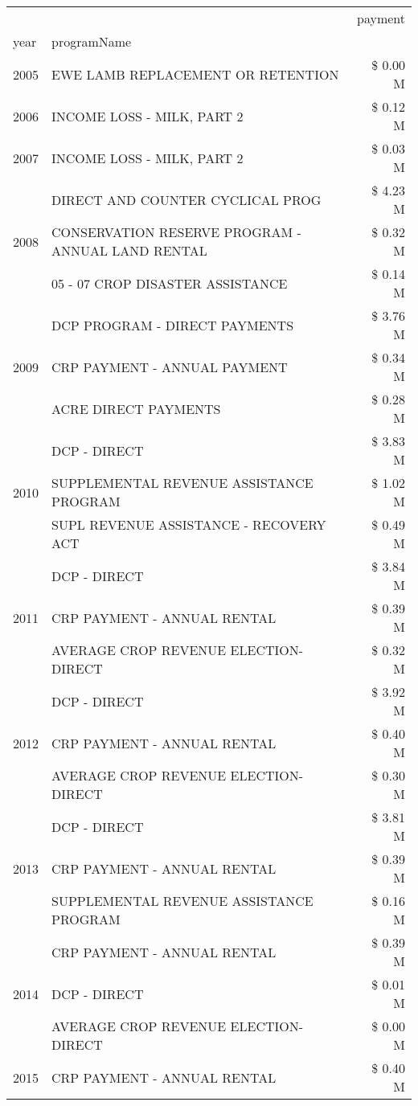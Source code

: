 \begin{tabular}{llr}
\toprule
 &  & payment \\
year & programName &  \\
\midrule
2005 & EWE LAMB REPLACEMENT OR RETENTION & \$ 0.00 M \\
\cline{1-3}
2006 & INCOME LOSS - MILK, PART 2 & \$ 0.12 M \\
\cline{1-3}
2007 & INCOME LOSS - MILK, PART 2 & \$ 0.03 M \\
\cline{1-3}
\multirow[t]{3}{*}{2008} & DIRECT AND COUNTER CYCLICAL PROG & \$ 4.23 M \\
 & CONSERVATION RESERVE PROGRAM - ANNUAL LAND RENTAL & \$ 0.32 M \\
 & 05 - 07 CROP DISASTER ASSISTANCE & \$ 0.14 M \\
\cline{1-3}
\multirow[t]{3}{*}{2009} & DCP PROGRAM - DIRECT PAYMENTS & \$ 3.76 M \\
 & CRP PAYMENT - ANNUAL PAYMENT & \$ 0.34 M \\
 & ACRE DIRECT PAYMENTS & \$ 0.28 M \\
\cline{1-3}
\multirow[t]{3}{*}{2010} & DCP - DIRECT & \$ 3.83 M \\
 & SUPPLEMENTAL REVENUE ASSISTANCE PROGRAM & \$ 1.02 M \\
 & SUPL REVENUE ASSISTANCE - RECOVERY ACT & \$ 0.49 M \\
\cline{1-3}
\multirow[t]{3}{*}{2011} & DCP - DIRECT & \$ 3.84 M \\
 & CRP PAYMENT - ANNUAL RENTAL & \$ 0.39 M \\
 & AVERAGE CROP REVENUE ELECTION-DIRECT & \$ 0.32 M \\
\cline{1-3}
\multirow[t]{3}{*}{2012} & DCP - DIRECT & \$ 3.92 M \\
 & CRP PAYMENT - ANNUAL RENTAL & \$ 0.40 M \\
 & AVERAGE CROP REVENUE ELECTION-DIRECT & \$ 0.30 M \\
\cline{1-3}
\multirow[t]{3}{*}{2013} & DCP - DIRECT & \$ 3.81 M \\
 & CRP PAYMENT - ANNUAL RENTAL & \$ 0.39 M \\
 & SUPPLEMENTAL REVENUE ASSISTANCE PROGRAM & \$ 0.16 M \\
\cline{1-3}
\multirow[t]{3}{*}{2014} & CRP PAYMENT - ANNUAL RENTAL & \$ 0.39 M \\
 & DCP - DIRECT & \$ 0.01 M \\
 & AVERAGE CROP REVENUE ELECTION-DIRECT & \$ 0.00 M \\
\cline{1-3}
\multirow[t]{3}{*}{2015} & CRP PAYMENT - ANNUAL RENTAL & \$ 0.40 M \\

\end{tabular}
